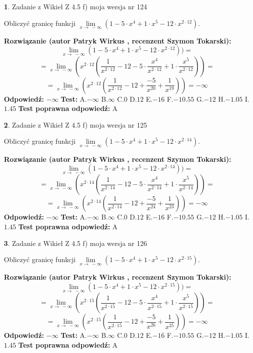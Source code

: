 \documentclass[12pt, a4paper]{article}
\theoremstyle{definition} %
\newtheorem{zad}{}
\newcommand{\zadStart}[1]{\begin{zad}#1\newline}
\newcommand{\zadStop}{\end{zad}}
\newcommand{\rozwStart}[2]{\noindent \textbf{Rozwiązanie (autor #1 , recenzent #2): }\newline}
\newcommand{\rozwStop}{\newline}
\newcommand{\odpStart}{\noindent \textbf{Odpowiedź:}\newline}
\newcommand{\odpStop}{\newline}
\newcommand{\testStart}{\noindent \textbf{Test:}\newline}
\newcommand{\testStop}{\newline}
\newcommand{\kluczStart}{\noindent \textbf{Test poprawna odpowiedź:}\newline}
\newcommand{\kluczStop}{\newline}
\begin{document}
\zadStart{Zadanie z Wikieł Z 4.5 f) moja wersja nr 124}


Obliczyć granicę funkcji  $\lim\limits_{x\to\ -\infty}(1 - 5 \cdot x^{4}+1 \cdot x^{5}- 12 \cdot x^{2\cdot12})$.
\zadStop
\rozwStart{Patryk Wirkus}{Szymon Tokarski}
$$\lim\limits_{x\to\ -\infty}(1 - 5 \cdot x^{4}+1 \cdot x^{5}- 12 \cdot x^{2\cdot12}))=$$
$$=\lim\limits_{x\to\ -\infty}(x^{2\cdot12}(\frac{1}{x^{2\cdot12}}-12 -5 \cdot \frac{x^{4}}{x^{2\cdot12}}+1 \cdot \frac{x^{5}}{x^{2\cdot12}}))=$$
$$=\lim\limits_{x\to\ -\infty}(x^{2\cdot12}(\frac{1}{x^{2\cdot12}}-12 + \frac{-5}{x^{20}}+ \frac{1}{x^{19}}))=-\infty$$
\rozwStop
\odpStart
$-\infty$
\odpStop
\testStart
A.$-\infty$ B.$\infty$ C.$0$ D.$12$ E.$-16$
F.$-10.55$ G.$-12$
H.$-1.05$
I.$1.45$
\testStop
\kluczStart
A
\kluczStop



\zadStart{Zadanie z Wikieł Z 4.5 f) moja wersja nr 125}


Obliczyć granicę funkcji  $\lim\limits_{x\to\ -\infty}(1 - 5 \cdot x^{4}+1 \cdot x^{5}- 12 \cdot x^{2\cdot14})$.
\zadStop
\rozwStart{Patryk Wirkus}{Szymon Tokarski}
$$\lim\limits_{x\to\ -\infty}(1 - 5 \cdot x^{4}+1 \cdot x^{5}- 12 \cdot x^{2\cdot14}))=$$
$$=\lim\limits_{x\to\ -\infty}(x^{2\cdot14}(\frac{1}{x^{2\cdot14}}-12 -5 \cdot \frac{x^{4}}{x^{2\cdot14}}+1 \cdot \frac{x^{5}}{x^{2\cdot14}}))=$$
$$=\lim\limits_{x\to\ -\infty}(x^{2\cdot14}(\frac{1}{x^{2\cdot14}}-12 + \frac{-5}{x^{24}}+ \frac{1}{x^{23}}))=-\infty$$
\rozwStop
\odpStart
$-\infty$
\odpStop
\testStart
A.$-\infty$ B.$\infty$ C.$0$ D.$12$ E.$-16$
F.$-10.55$ G.$-12$
H.$-1.05$
I.$1.45$
\testStop
\kluczStart
A
\kluczStop



\zadStart{Zadanie z Wikieł Z 4.5 f) moja wersja nr 126}


Obliczyć granicę funkcji  $\lim\limits_{x\to\ -\infty}(1 - 5 \cdot x^{4}+1 \cdot x^{5}- 12 \cdot x^{2\cdot15})$.
\zadStop
\rozwStart{Patryk Wirkus}{Szymon Tokarski}
$$\lim\limits_{x\to\ -\infty}(1 - 5 \cdot x^{4}+1 \cdot x^{5}- 12 \cdot x^{2\cdot15}))=$$
$$=\lim\limits_{x\to\ -\infty}(x^{2\cdot15}(\frac{1}{x^{2\cdot15}}-12 -5 \cdot \frac{x^{4}}{x^{2\cdot15}}+1 \cdot \frac{x^{5}}{x^{2\cdot15}}))=$$
$$=\lim\limits_{x\to\ -\infty}(x^{2\cdot15}(\frac{1}{x^{2\cdot15}}-12 + \frac{-5}{x^{26}}+ \frac{1}{x^{25}}))=-\infty$$
\rozwStop
\odpStart
$-\infty$
\odpStop
\testStart
A.$-\infty$ B.$\infty$ C.$0$ D.$12$ E.$-16$
F.$-10.55$ G.$-12$
H.$-1.05$
I.$1.45$
\testStop
\kluczStart
A
\kluczStop
\end{document}
